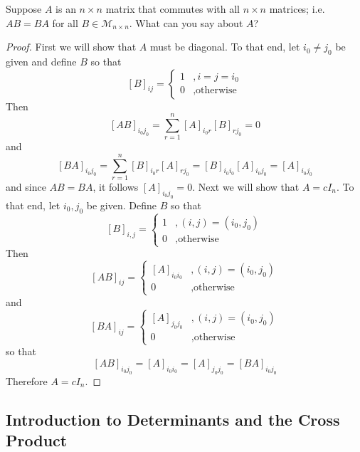 \begin{exercise} \label{e1.4.37}
    Suppose \( A \) is an \( n \times n \) matrix that commutes with all \( n \times n \) matrices; i.e. \( AB = BA \) for all \( B \in \mathcal{M}_{n \times n} \). What can you say about \( A \)?
    
    \begin{proof}
        First we will show that \( A \) must be diagonal. To that end, let \( i_0 \neq j_0 \) be given and define \( B \) so that
        \[
            \left[ B \right]_{ij} =
            \begin{cases}
                    1 &, i = j = i_0 \\
                    0 &, \text{otherwise}
            \end{cases}
        \]
        Then
        \[ [AB]_{i_0j_0} = \sum_{r=1}^n [A]_{i_0r}[B]_{rj_0} = 0 \]
        and
        \[ [BA]_{i_0j_0} = \sum_{r=1}^n [B]_{i_0r}[A]_{rj_0} = [B]_{i_0i_0}[A]_{i_0j_0} = [A]_{i_0j_0} \]
        and since \( AB = BA \), it follows \( [A]_{i_0j_0} = 0 \). Next we will show that \( A = cI_n \). To that end, let \( i_0, j_0 \) be given. Define \( B \) so that
        \[
            [B]_{i,j} =
            \begin{cases}
                    1 &, (i,j) = (i_0,j_0) \\
                    0 &, \text{otherwise}
            \end{cases}
        \]
        Then
        \[
            [AB]_{ij} = 
            \begin{cases}
                    [A]_{i_0i_0} &, (i,j) = (i_0,j_0) \\
                    0 &, \text{otherwise}
            \end{cases}
        \]
        and
        \[
            [BA]_{ij} =
            \begin{cases}
                [A]_{j_0j_0} &, (i,j) = (i_0,j_0) \\
                0 &, \text{otherwise}
            \end{cases}
        \]
        so that
        \[ [AB]_{i_0j_0} = [A]_{i_0i_0} = [A]_{j_0j_0} = [BA]_{i_0j_0}\]
        Therefore \( A = cI_n \).
    \end{proof}
\end{exercise} %
 
\subsection{Introduction to Determinants and the Cross Product}